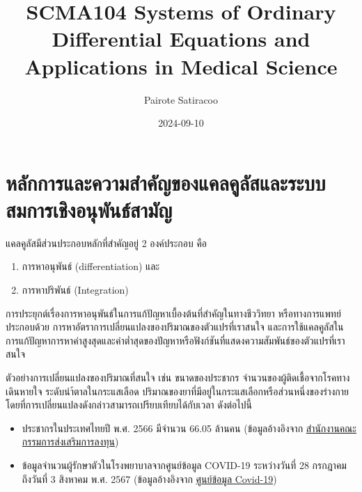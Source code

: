 \documentclass[
]{book}
\title{SCMA104 Systems of Ordinary Differential Equations and
Applications in Medical Science}
\author{Pairote Satiracoo}
\date{2024-09-10}
\begin{document}
\frontmatter
\maketitle

{
\setcounter{tocdepth}{1}
\tableofcontents
}
\mainmatter
\chapter{หลักการและความสำคัญของแคลคูลัสและระบบสมการเชิงอนุพันธ์สามัญ}\label{uxe2buxe25uxe01uxe01uxe32uxe23uxe41uxe25uxe30uxe04uxe27uxe32uxe21uxe2auxe33uxe04uxe0duxe02uxe2duxe07uxe41uxe04uxe25uxe04uxe25uxe2auxe41uxe25uxe30uxe23uxe30uxe1auxe1auxe2auxe21uxe01uxe32uxe23uxe40uxe0auxe07uxe2duxe19uxe1euxe19uxe18uxe2auxe32uxe21uxe0d}

แคลคูลัสมีส่วนประกอบหลักที่สำคัญอยู่ 2 องค์ประกอบ คือ

\begin{enumerate}
\def\labelenumi{\arabic{enumi}.}
\item
  การหาอนุพันธ์ (differentiation) และ
\item
  การหาปริพันธ์ (Integration)
\end{enumerate}

การประยุกต์เรื่องการหาอนุพันธ์ในการแก้ปัญหาเบื้องต้นที่สำคัญในทางชีววิทยา หรือทางการแพทย์
ประกอบด้วย การหาอัตราการเปลี่ยนแปลงของปริมาณของตัวแปรที่เราสนใจ
และการใช้แคลคูลัสในการแก้ปัญหาการหาค่าสูงสุดและค่าต่ำสุดของปัญหาหรือฟังก์ชันที่แสดงความสัมพันธ์ของตัวแปรที่เราสนใจ

ตัวอย่างการเปลี่ยนแปลงของปริมาณที่สนใจ เช่น ขนาดของประชากร
จำนวนของผู้ติดเชื้อจากโรคทางเดินหายใจ ระดับนำ้ตาลในกระแสเลือด
ปริมาณของยาที่มีอยู่ในกระแสเลือกหรือส่วนหนึ่งของร่างกาย
โดยที่การเปลี่ยนแปลงดังกล่าวสามารถเปรียบเทียบได้กับเวลา ดังต่อไปนี้

\begin{itemize}
\item
  ประชากรในประเทศไทยปี พ.ศ. 2566 มีจำนวน 66.05 ล้านคน (ข้อมูลอ้างอิงจาก
  \href{https://www.boi.go.th/index.php?page=demographic}{สำนักงานคณะกรรมการส่งเสริมการลงทุน})
\item
  ข้อมูลจำนวนผู้รักษาตัวในโรงพยาบาลจากศูนย์ข้อมูล COVID-19 ระหว่างวันที่ 28 กรกฎาคม
  ถึงวันที่ 3 สิงหาคม พ.ศ. 2567 (ข้อมูลอ้างอิงจาก
  \href{https://www.facebook.com/informationcovid19?locale=th_TH}{ศูนย์ข้อมูล
  Covid-19})
\end{itemize}
\end{document}
